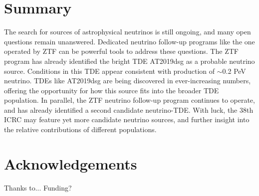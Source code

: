 \documentclass[a4paper,11pt]{article}
\begin{document}
\section{Summary}

The search for sources of astrophysical neutrinos is still ongoing, and many open questions remain unanswered. Dedicated neutrino follow-up programs like the one operated by ZTF  can be powerful tools to address these questions. The ZTF program has already identified the bright TDE AT2019dsg as a probable neutrino source. Conditions in this TDE appear consistent with production of $\sim$0.2 PeV neutrino. TDEs like AT2019dsg are being discovered in ever-increasing numbers, offering the opportunity for how this source fits into the broader TDE population. In parallel, the ZTF neutrino follow-up program continues to operate, and has already identified a second candidate neutrino-TDE. With luck, the 38th ICRC may feature yet more candidate neutrino sources, and further insight into the relative contributions of different populations.

\section{Acknowledgements}

Thanks to... Funding?




%
\end{document}
